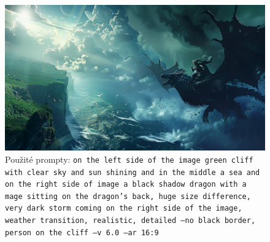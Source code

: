 \begin{figure}
    \centering
    \includegraphics[width=\textwidth]{resources/figures/background.png}
    \caption{Použité prompty: \texttt{on the left side of the image green cliff with clear sky and sun shining and in the middle a sea and on the right side of image a black shadow dragon with a mage sitting on the dragon's back, huge size difference, very dark storm coming on the right side of the image, weather transition, realistic, detailed --no black border, person on the cliff --v 6.0 --ar 16:9}}
    \label{fig:background}
\end{figure}